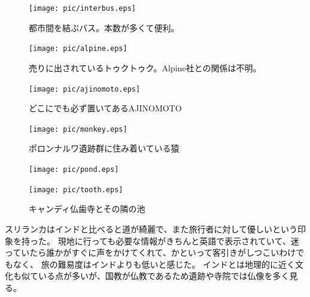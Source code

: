 \begin{figure}[H]
  \begin{minipage}{0.5\hsize}
  \begin{center}
    \texttt{[image: pic/interbus.eps]}
  \end{center}
  \caption{都市間を結ぶバス。本数が多くて便利。}
  \end{minipage}
  \begin{minipage}{0.5\hsize}
  \begin{center}
    \texttt{[image: pic/alpine.eps]}
  \end{center}
  \caption{売りに出されているトゥクトゥク。Alpine社との関係は不明。}
  \end{minipage}
\end{figure}
\begin{figure}[H]
  \begin{minipage}{0.5\hsize}
  \begin{center}
    \texttt{[image: pic/ajinomoto.eps]}
  \end{center}
  \caption{どこにでも必ず置いてあるAJINOMOTO}
  \end{minipage}
  \begin{minipage}{0.5\hsize}
  \begin{center}
    \texttt{[image: pic/monkey.eps]}
  \end{center}
  \caption{ポロンナルワ遺跡群に住み着いている猿}
  \end{minipage}
\end{figure}
\begin{figure}[H]
  \begin{minipage}{0.5\hsize}
  \begin{center}
    \texttt{[image: pic/pond.eps]}
  \end{center}
  \end{minipage}
  \begin{minipage}{0.5\hsize}
  \begin{center}
    \texttt{[image: pic/tooth.eps]}
  \end{center}
  \end{minipage}
  \caption{キャンディ仏歯寺とその隣の池}
\end{figure}
スリランカはインドと比べると道が綺麗で、また旅行者に対して優しいという印象を持った。
現地に行っても必要な情報がきちんと英語で表示されていて、迷っていたら誰かがすぐに声をかけてくれて、かといって客引きがしつこいわけでもなく、
旅の難易度はインドよりも低いと感じた。
インドとは地理的に近く文化も似ている点が多いが、国教が仏教であるため遺跡や寺院では仏像を多く見る。
